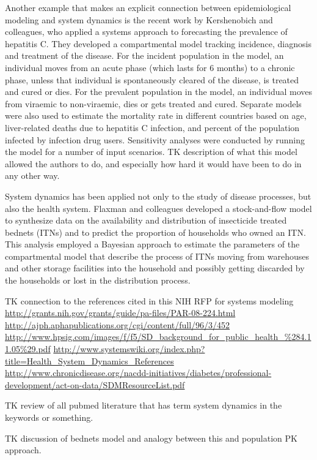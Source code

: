 Another example that makes an explicit connection between
epidemiological modeling and system dynamics is the recent work by
Kershenobich and colleagues, who applied a systems approach to
forecasting the prevalence of hepatitis C. They developed a
compartmental model tracking incidence, diagnosis and treatment of the
disease. For the incident population in the model, an individual moves
from an acute phase (which lasts for 6 months) to a chronic phase,
unless that individual is spontaneously cleared of the disease, is
treated and cured or dies. For the prevalent population in the model,
an individual moves from viraemic to non-viraemic, dies or gets
treated and cured. Separate models were also used to estimate the
mortality rate in different countries based on age, liver-related
deaths due to hepatitis C infection, and percent of the population
infected by infection drug users. Sensitivity analyses were conducted
by running the model for a number of input scenarios.  TK description
of what this model allowed the authors to do, and especially how hard
it would have been to do in any other way.

System dynamics has been applied not only to the study of disease
processes, but also the health system. Flaxman and colleagues
developed a stock-and-flow model to synthesize data on the
availability and distribution of insecticide treated bednets (ITNs)
and to predict the proportion of households who owned an ITN. This
analysis employed a Bayesian approach to estimate the parameters of
the compartmental model that describe the process of ITNs moving from
warehouses and other storage facilities into the household and
possibly getting discarded by the households or lost in the
distribution process.



TK connection to the references cited in this NIH RFP for systems modeling
\url{http://grants.nih.gov/grants/guide/pa-files/PAR-08-224.html}
\url{http://ajph.aphapublications.org/cgi/content/full/96/3/452}
\url{http://www.hpsig.com/images/f/f5/SD_background_for_public_health_%284.11.05%29.pdf}
\url{http://www.systemswiki.org/index.php?title=Health_System_Dynamics_References}
\url{http://www.chronicdisease.org/nacdd-initiatives/diabetes/professional-development/act-on-data/SDMResourceList.pdf}

TK review of all pubmed literature that has term system dynamics in
the keywords or something.

TK discussion of bednets model and analogy between this and population
PK approach.

